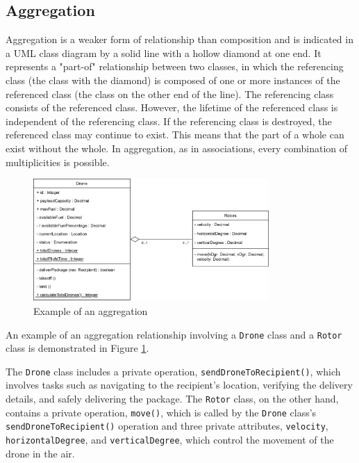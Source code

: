 \documentclass[
	12pt,
    a4paper,
    egregdoesnotlikesansseriftitles, %
    toc=chapterentrywithdots,
    oneside, openany,
    titlepage,
    parskip=half,
    headings=normal,  %
    listof=totoc,
    bibliography=totoc,
    index=totoc,
    captions=tableheading,  %
    listof=flat,
    numbers=noenddot, %
    final]
    {scrbook}
\begin{document}
\subsection{Aggregation}
Aggregation is a weaker form of relationship than composition and is indicated in a UML class diagram by a solid line with a hollow diamond at one end. 
It represents a "part-of" relationship between two classes, in which the referencing class (the class with the diamond) is composed of one or more instances of the referenced class (the class on the other end of the line).
The referencing class consists of the referenced class.
However, the lifetime of the referenced class is independent of the referencing class.
If the referencing class is destroyed, the referenced class may continue to exist.
This means that the part of a whole can exist without the whole.
In aggregation, as in associations, every combination of multiplicities is possible. \cite[p. 153]{uml}


\begin{figure}[h]
	\centering
	\includegraphics[width=0.8\textwidth]{figures/aggr_comp/aggr.jpg}
	\caption[Example aggregation]{Example of an aggregation}
	\label{fig:aggregation_example} 
\end{figure}


An example of an aggregation relationship involving a \texttt{Drone} class and a \texttt{Rotor} class is demonstrated in Figure \ref{fig:aggregation_example}. 

The \texttt{Drone} class  includes a private operation, \texttt{sendDroneToRecipient()}, which involves tasks such as navigating to the recipient's location, verifying the delivery details, and safely delivering the package.
The \texttt{Rotor} class, on the other hand, contains a private operation, \texttt{move()}, which is called by the \texttt{Drone} class's \texttt{sendDroneToRecipient()} operation and three private attributes, \texttt{velocity}, \texttt{horizontalDegree}, and \texttt{verticalDegree}, which control the movement of the drone in the air. 
\end{document}

